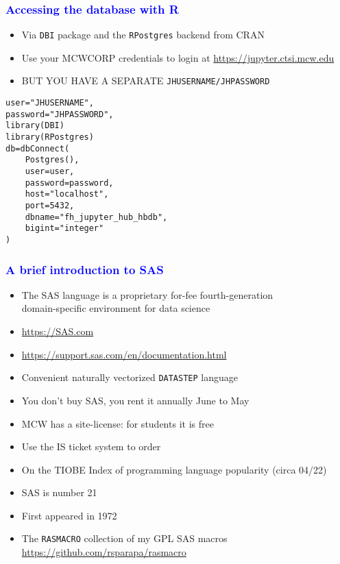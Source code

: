 \documentclass[11pt,pdftex,dvipsnames,usenames]{beamer}
\begin{document}
\begin{frame}[fragile]\frametitle{\bf\textcolor{blue}{Accessing the database with R}}

\begin{itemize}
\item Via \texttt{DBI} package and the \texttt{RPostgres} backend from CRAN 
\item Use your MCWCORP credentials to login at 
\href{https://jupyter.ctsi.mcw.edu}{https://jupyter.ctsi.mcw.edu}
\item BUT YOU HAVE A SEPARATE \texttt{JHUSERNAME/JHPASSWORD}
\end{itemize}
\begin{verbatim}
user="JHUSERNAME", 
password="JHPASSWORD",
library(DBI)
library(RPostgres)
db=dbConnect(
    Postgres(), 
    user=user,
    password=password,
    host="localhost", 
    port=5432, 
    dbname="fh_jupyter_hub_hbdb",
    bigint="integer"
)
\end{verbatim}

\end{frame}


\begin{frame}[fragile]\frametitle{\bf\textcolor{blue}{A brief introduction to SAS}}

\begin{itemize}
\item The SAS language is a proprietary for-fee fourth-generation\\ domain-specific environment for data science
\item \href{https://SAS.com}{https://SAS.com}
\item \href{https://support.sas.com/en/documentation.html}{https://support.sas.com/en/documentation.html}
\item Convenient naturally vectorized \texttt{DATASTEP} language 
\item You don't buy SAS, you rent it annually June to May
\item MCW has a site-license: for students it is free
\item Use the IS ticket system to order
\item On the TIOBE Index of programming language popularity (circa 04/22)
\item SAS is number 21 
\item First appeared in 1972
\item The \texttt{RASMACRO} collection of my GPL SAS macros 
\href{https://github.com/rsparapa/rasmacro}{https://github.com/rsparapa/rasmacro}
\end{itemize}

\end{frame}
\end{document}
